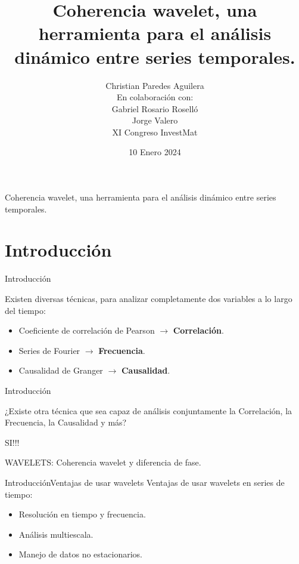 \documentclass[11pt]{beamer}
\author[Christian Paredes A.]{\footnotesize Christian Paredes Aguilera \\ \vspace{4mm} En colaboración con:\\ \vspace{1mm} Gabriel Rosario Roselló  \\ Jorge Valero \\\vspace{4mm} {\color{blue} XI Congreso InvestMat}}
\title [XI Congreso InvestMat] {Coherencia wavelet, una herramienta para el análisis dinámico entre series temporales.}
\date{10 Enero 2024}
\begin{document}
\begin{frame}
		\maketitle
	\end{frame}

	\begin{frame}{\footnotesize Coherencia wavelet, una herramienta para el análisis dinámico entre series temporales.}
		\tableofcontents
	\end{frame}
	
\section{Introducción}
	

    \begin{frame}{Introducción}

	Existen diversas técnicas, para analizar completamente dos variables a lo largo del tiempo:
	\vspace{5mm}
	\begin{itemize}
	    \item Coeficiente de correlación de Pearson $\rightarrow$ \textbf{Correlación}.
	    \item Series de Fourier $\rightarrow$ \textbf{Frecuencia}.
	    \item Causalidad de Granger $\rightarrow$ \textbf{Causalidad}.
	\end{itemize}
    \end{frame}

    \begin{frame}{Introducción}

	\begin{center}
	    ¿Existe otra técnica que sea capaz de análisis conjuntamente la Correlación, la Frecuencia, la Causalidad y más?
	\end{center}

	\begin{center}
	    SI!!!
	\end{center}

	\begin{center}
	    WAVELETS: Coherencia wavelet y diferencia de fase.
	\end{center}

    \end{frame}

    \begin{frame}{Introducción}{Ventajas de usar wavelets}
	Ventajas de usar wavelets en series de tiempo:
	\vspace{5mm}
	\begin{itemize}	
	    \item Resolución en tiempo y frecuencia.
	    \item Análisis multiescala.
	    \item Manejo de datos no estacionarios.
	\end{itemize}

    \end{frame}
\end{document}
